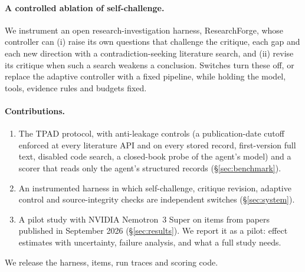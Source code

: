 \paragraph{A controlled ablation of self-challenge.} We instrument an open research-investigation harness, ResearchForge, whose controller can (i) raise its own questions that challenge the critique, each gap and each new direction with a contradiction-seeking literature search, and (ii) revise its critique when such a search weakens a conclusion. Switches turn these off, or replace the adaptive controller with a fixed pipeline, while holding the model, tools, evidence rules and budgets fixed.

\paragraph{Contributions.}
\begin{enumerate}
  \item The TPAD protocol, with anti-leakage controls (a publication-date cutoff enforced at every literature API and on every stored record, first-version full text, disabled code search, a closed-book probe of the agent's model) and a scorer that reads only the agent's structured records (\S\ref{sec:benchmark}).
  \item An instrumented harness in which self-challenge, critique revision, adaptive control and source-integrity checks are independent switches (\S\ref{sec:system}).
  \item A pilot study with NVIDIA Nemotron~3 Super on \PilotItems{} items from papers published in September 2026 (\S\ref{sec:results}). We report it as a pilot: effect estimates with uncertainty, failure analysis, and what a full study needs.
\end{enumerate}
We release the harness, items, run traces and scoring code.
